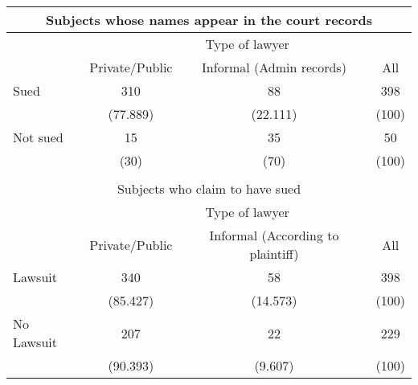 
    \begin{tabular}{rccc}
    \toprule
    \toprule
    \multicolumn{4}{c}{Subjects whose names appear in the court records} \\
    \midrule
          & \multicolumn{3}{c}{Type of lawyer} \\
          & Private/Public & Informal (Admin records) & All \\
    \midrule
    \multicolumn{1}{l}{Sued} & 310   & 88    & 398 \\
          & (77.889) & (22.111) & (100) \\
    \multicolumn{1}{l}{Not sued} & 15    & 35    & 50 \\
          & (30)  & (70)  & (100) \\
          &       &       &  \\
    \midrule
    \midrule
    \multicolumn{4}{c}{Subjects who claim to have sued} \\
    \midrule
          & \multicolumn{3}{c}{Type of lawyer} \\
          & Private/Public & Informal (According to plaintiff) & All \\
    \midrule
    \multicolumn{1}{l}{Lawsuit} & 340   & 58    & 398 \\
          & (85.427) & (14.573) & (100) \\
    \multicolumn{1}{l}{No Lawsuit} & 207   & 22    & 229 \\
          & (90.393) & (9.607) & (100) \\
    \bottomrule
    \bottomrule
    \end{tabular}%
 
